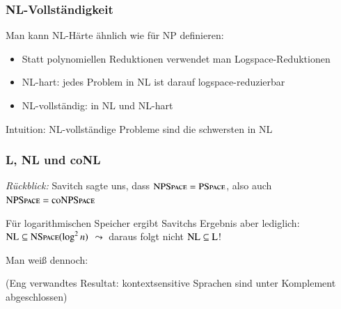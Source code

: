 \documentclass[onlymath]{beamer}
\begin{document}
\begin{frame}\frametitle{NL-Vollständigkeit}

Man kann NL-Härte ähnlich wie für NP definieren:
\begin{itemize}
\item Statt polynomiellen Reduktionen verwendet man Logspace-Reduktionen
\item NL-hart: jedes Problem in NL ist darauf logspace-reduzierbar
\item NL-vollständig: in NL und NL-hart
\end{itemize}
Intuition: NL-vollständige Probleme sind die schwersten in NL
\bigskip\pause

\bigskip\pause


\end{frame}

\begin{frame}\frametitle{L, NL und coNL}

\emph{Rückblick:} Savitch sagte uns, dass ${\textsc{NPSpace}}={\textsc{PSpace}}$, also auch ${\textsc{NPSpace}}={\textsc{coNPSpace}}$
\bigskip\pause

Für logarithmischen Speicher ergibt Savitchs Ergebnis aber lediglich: ${\textsc{NL}}\subseteq{\textsc{NSpace}}(\log^2 n)$
$\leadsto$ daraus folgt nicht ${\textsc{NL}}\subseteq{\textsc{L}}$!
\bigskip\pause

Man weiß dennoch:\bigskip

\pause\medskip

\bigskip

{\tiny
(Eng verwandtes Resultat: kontextsensitive Sprachen sind unter Komplement abgeschlossen)

}

\end{frame}

\end{document}
